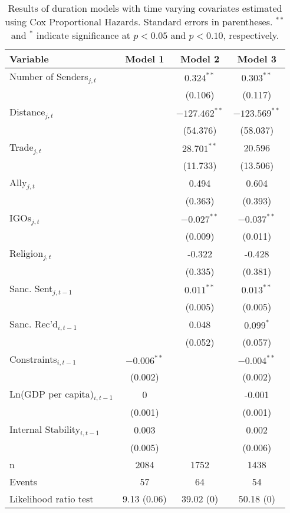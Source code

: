 \begin{table}[ht]
\centering
{\normalsize
\begin{tabular}{lccc}
 Variable & Model 1 & Model 2 & Model 3 \\ 
  \hline
\hline
Number of Senders$_{j,t}$ &  & $0.324^{\ast\ast}$ & $0.303^{\ast\ast}$ \\ 
   &  & (0.106) & (0.117) \\ 
  Distance$_{j,t}$ &  & $-127.462^{\ast\ast}$ & $-123.569^{\ast\ast}$ \\ 
   &  & (54.376) & (58.037) \\ 
  Trade$_{j,t}$ &  & $28.701^{\ast\ast}$ & 20.596 \\ 
   &  & (11.733) & (13.506) \\ 
  Ally$_{j,t}$ &  & 0.494 & 0.604 \\ 
   &  & (0.363) & (0.393) \\ 
  IGOs$_{j,t}$ &  & $-0.027^{\ast\ast}$ & $-0.037^{\ast\ast}$ \\ 
   &  & (0.009) & (0.011) \\ 
  Religion$_{j,t}$ &  & -0.322 & -0.428 \\ 
   &  & (0.335) & (0.381) \\ 
   \hline
Sanc. Sent$_{j,t-1}$ &  & $0.011^{\ast\ast}$ & $0.013^{\ast\ast}$ \\ 
   &  & (0.005) & (0.005) \\ 
  Sanc. Rec'd$_{i,t-1}$ &  & 0.048 & $0.099^{\ast}$ \\ 
   &  & (0.052) & (0.057) \\ 
   \hline
Constraints$_{i,t-1}$ & $-0.006^{\ast\ast}$ &  & $-0.004^{\ast\ast}$ \\ 
   & (0.002) &  & (0.002) \\ 
  Ln(GDP per capita)$_{i,t-1}$ & 0 &  & -0.001 \\ 
   & (0.001) &  & (0.001) \\ 
  Internal Stability$_{i,t-1}$ & 0.003 &  & 0.002 \\ 
   & (0.005) &  & (0.006) \\ 
   \hline
n & 2084 & 1752 & 1438 \\ 
  Events & 57 & 64 & 54 \\ 
  Likelihood ratio test & 9.13 (0.06) & 39.02 (0) & 50.18 (0) \\ 
   \hline
\hline
\end{tabular}
}
\caption{Results of duration models with time varying covariates estimated using Cox Proportional Hazards. Standard errors in parentheses. $^{**}$ and $^{*}$ indicate significance at $p< 0.05 $ and $p< 0.10 $, respectively.} 
\end{table}
